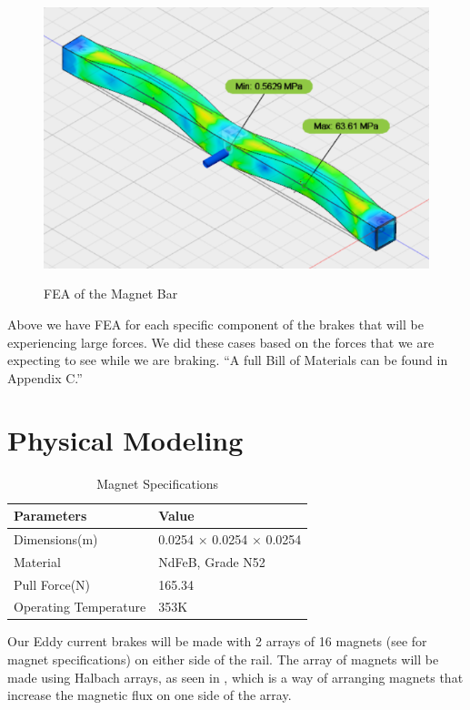 \documentclass[main.tex]{subfiles}
\begin{document}
    \begin{figure}[H]
    	\centering
        \includegraphics[width=\linewidth]{images/MagnetBarFEA}
        \label{fig:MagnetBar}
        \caption{FEA of the Magnet Bar}
    \end{figure}
    Above we have FEA for each specific component of the brakes that will be experiencing large forces. We did these cases based on the forces that we are expecting to see while we are braking.
    “A full Bill of Materials can be found in Appendix C.”

    \section{Physical Modeling}
    \begin{table}[H]
    	\centering
    	\begin{tabular}{ll} \toprule
            Parameters & Value\\ \midrule
            Dimensions(\si{m})     & 0.0254 $\times$ 0.0254 $\times$ 0.0254 \\
            Material     & NdFeB, Grade N52   \\
            Pull Force(\si{N})     & 165.34 \\
            Operating Temperature     & 353K  \\ \bottomrule
        \end{tabular}
        \caption{Magnet Specifications}
        \label{table:magnets}
    \end{table}
    Our Eddy current brakes will be made with 2 arrays of 16 magnets (see  for magnet specifications) on either side of the rail. The array of magnets will be made using Halbach arrays, as seen in , which is a way of arranging magnets that increase the magnetic flux on one side of the array.\\
\end{document}
